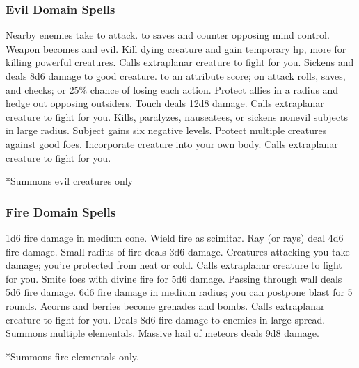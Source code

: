 \subsubsection{Evil Domain Spells}

\begin{spelllist}
   Nearby enemies take  to attack.
    to saves and counter opposing mind control.
   Weapon becomes  and evil.
   Kill dying creature and gain temporary hp, more for killing powerful creatures.
  \spellhead[3]{}
  \spellhead[3]{}
   Calls extraplanar creature to fight for you.
   Sickens and deals 8d6 damage to good creature.
    to an attribute score;  on attack rolls, saves, and checks; or 25\% chance of losing each action.
   Protect allies in a \areamed radius and hedge out opposing outsiders.
   Touch deals 12d8 damage.
   Calls extraplanar creature to fight for you.
   Kills, paralyzes, nauseatees, or sickens nonevil subjects in large radius.
  \spellhead[7]{}
   Subject gains six negative levels.
  \F Protect multiple creatures against good foes. 
   Incorporate creature into your own body.
   Calls extraplanar creature to fight for you.
\end{spelllist}
*Summons evil creatures only

\subsubsection{Fire Domain Spells}

\begin{spelllist}
   1d6 fire damage in medium cone.
  \spellhead[1]{}
   Wield fire as scimitar.
   Ray (or rays) deal 4d6 fire damage.
  \spellhead[3]{}
   Small radius of fire deals 3d6 damage.
   Creatures attacking you take damage; you're protected from heat or cold.
   Calls extraplanar creature to fight for you.
   Smite foes with divine fire for 5d6 damage.
   Passing through wall deals 5d6 fire damage.
   6d6 fire damage in medium radius; you can postpone blast for 5 rounds.
   Acorns and berries become grenades and bombs.
  \spellhead[7]{}
   Calls extraplanar creature to fight for you.
   Deals 8d6 fire damage to enemies in large spread.
   Summons multiple elementals.
   Massive hail of meteors deals 9d8 damage.
\end{spelllist}
*Summons fire elementals only.

